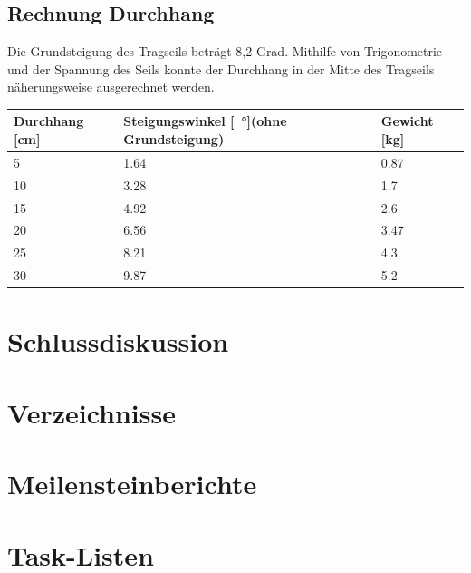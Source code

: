 \documentclass[a4paper]{report}
\begin{document}
\section{Rechnung Durchhang}
Die Grundsteigung des Tragseils beträgt 8,2 Grad. Mithilfe von Trigonometrie und der Spannung des Seils konnte der Durchhang in der Mitte des Tragseils näherungsweise ausgerechnet werden.

\vspace{1em}
\noindent
\begin{tabular}{|p{}|p{}|p{}|}
	\hline
	\textbf{Durchhang [cm]} & \textbf{Steigungswinkel [\SI{}{\degree}](ohne Grundsteigung)} &\textbf{Gewicht [kg]}\\
	\hline
	5&1.64&0.87\\
	\hline
	10&3.28&1.7\\
	\hline
	15&4.92&2.6\\
	\hline
	20&6.56&3.47\\
	\hline
	25&8.21&4.3\\
	\hline
	30&9.87&5.2\\
	\hline
\end{tabular}

\chapter{Schlussdiskussion}

\chapter*{Verzeichnisse}

\listoffigures

\listoftables

\printbibliography

\appendix

\chapter{Meilensteinberichte}

\chapter{Task-Listen}
\end{document}
